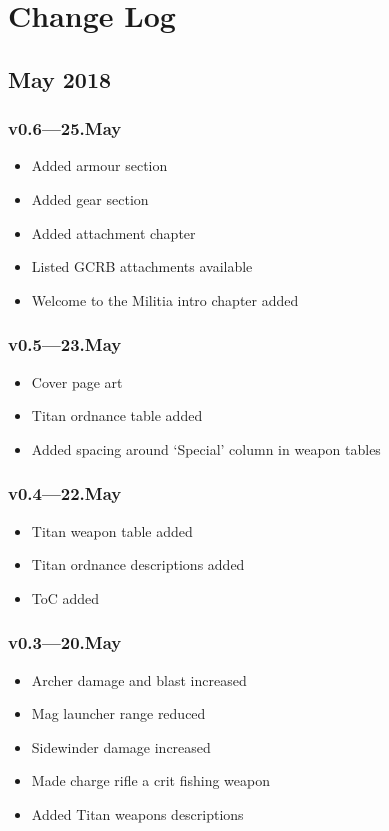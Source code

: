 \documentclass[9pt, openany]{extbook}
\begin{document}
\chapter{Change Log}
\label{changelog}
{\small

\section{May 2018}

\subsection{v0.6---25.May}
\begin{itemize}[noitemsep]
\item Added armour section
\item Added gear section
\item Added attachment chapter
\item Listed GCRB attachments available
\item Welcome to the Militia intro chapter added
\end{itemize}

\subsection{v0.5---23.May}
\begin{itemize}[noitemsep]
\item Cover page art
\item Titan ordnance table added
\item Added spacing around `Special' column in weapon tables
\end{itemize}

\subsection{v0.4---22.May}
\begin{itemize}[noitemsep]
\item Titan weapon table added
\item Titan ordnance descriptions added
\item ToC added
\end{itemize}


\subsection{v0.3---20.May}
\begin{itemize}[noitemsep]
\item Archer damage and blast increased
\item Mag launcher range reduced
\item Sidewinder damage increased
\item Made charge rifle a crit fishing weapon
\item Added Titan weapons descriptions
\end{itemize}


}
\end{document}
